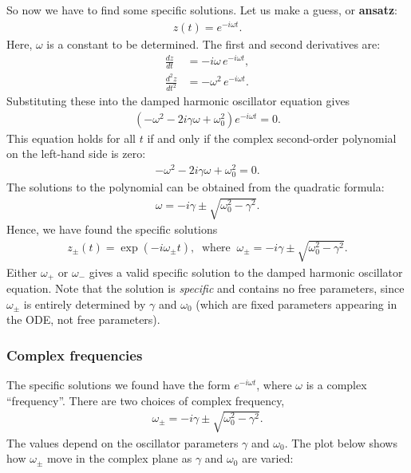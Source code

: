 \documentclass[10pt,a4paper]{article}
\begin{document}
So now we have to find some specific solutions. Let us make a guess,
or \textbf{ansatz}:
\begin{align}
  z(t) = e^{-i\omega t}.
\end{align}
Here, $\omega$ is a constant to be determined.  The first and second
derivatives are:
\begin{align}
  \frac{dz}{dt} &= -i\omega\, e^{-i\omega t}, \\
  \frac{d^2z}{dt^2} &= -\omega^2\, e^{-i\omega t}.
\end{align}
Substituting these into the damped harmonic oscillator equation gives
\begin{align}
  \left(-\omega^2 - 2i\gamma \omega + \omega_0^2 \right) e^{-i\omega t} = 0.
\end{align}
This equation holds for all $t$ if and only if the complex
second-order polynomial on the left-hand side is zero:
\begin{align}
  -\omega^2 - 2i\gamma \omega + \omega_0^2 = 0.
\end{align}
The solutions to the polynomial can be obtained from the quadratic
formula:
\begin{align}
  \omega = -i\gamma \pm \sqrt{\omega_0^2 - \gamma^2}.
\end{align}
Hence, we have found the specific solutions
\begin{align}
  z_\pm(t) = \exp\left(-i\omega_\pm t\right),
  \;\;\mathrm{where}\;\;
  \omega_\pm = -i\gamma \pm \sqrt{\omega_0^2 - \gamma^2}.
\end{align}
Either $\omega_+$ or $\omega_-$ gives a valid specific solution to the
damped harmonic oscillator equation. Note that the solution is
\textit{specific} and contains no free parameters, since $\omega_\pm$
is entirely determined by $\gamma$ and $\omega_0$ (which are fixed
parameters appearing in the ODE, not free parameters).

\subsubsection{Complex frequencies}
\label{complex-frequencies}

The specific solutions we found have the form $e^{-i\omega t}$, where
$\omega$ is a complex ``frequency''.  There are two choices of complex
frequency,
\begin{align}
  \omega_\pm = -i\gamma \pm \sqrt{\omega_0^2 - \gamma^2}.
  \label{eq:omegapm}
\end{align}
The values depend on the oscillator parameters $\gamma$ and
$\omega_0$.  The plot below shows how $\omega_\pm$ move in the complex
plane as $\gamma$ and $\omega_0$ are varied:
\end{document}

